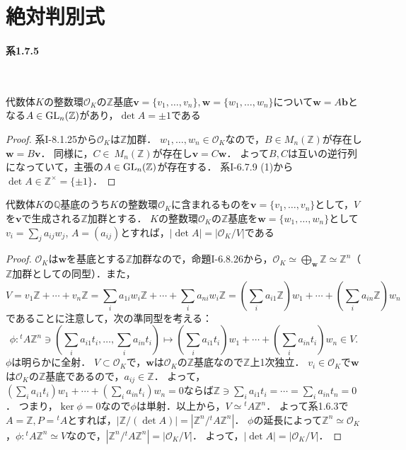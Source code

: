 \setcounter{section}{6}
\section{絶対判別式}
\paragraph{系1.7.5}~
\begin{screen}
  代数体$K$の整数環$\mathcal{O}_K$の$\mathbb{Z}$基底$\boldsymbol{v} = \{v_1, \ldots, v_n\}, \boldsymbol{w} = \{w_1, \ldots, w_n\}$について$\boldsymbol{w} = A\boldsymbol{b}$となる$A\in\operatorname{GL}_n(\mathbb{Z})$があり，$\det{A} = \pm 1$である
\end{screen}
\begin{proof}
  系I-8.1.25から$\mathcal{O}_K$は$\mathbb{Z}$加群．
  $w_1, \ldots, w_n\in\mathcal{O}_K$なので，$B\in M_n(\mathbb{Z})$が存在し$\boldsymbol{w} = B\boldsymbol{v}$．
  同様に，$C\in\ M_n(\mathbb{Z})$が存在し$\boldsymbol{v} = C\boldsymbol{w}$．
  よって$B, C$は互いの逆行列になっていて，主張の$A\in\operatorname{GL}_n(\mathbb{Z})$が存在する．
  系I-6.7.9 (1)から$\det A\in\mathbb{Z}^\times = \{\pm 1\}$．
\end{proof}

\begin{screen}
  代数体$K$の$\mathbb{Q}$基底のうち$K$の整数環$\mathcal{O}_K$に含まれるものを$\boldsymbol{v} = \{v_1, \ldots, v_n\}$として，$V$を$\boldsymbol{v}$で生成される$\mathbb{Z}$加群とする．
  $K$の整数環$\mathcal{O}_K$の$\mathbb{Z}$基底を$\boldsymbol{w} = \{w_1, \ldots, w_n\}$として$v_i = \sum_ja_{ij}w_j$, $A = (a_{ij})$とすれば，$|\det A| = |\mathcal{O}_K/V|$である
\end{screen}
\begin{proof}
  $\mathcal{O}_K$は$\boldsymbol{w}$を基底とする$\mathbb{Z}$加群なので，命題I-6.8.26から，$\mathcal{O}_K\simeq\bigoplus_{\boldsymbol{w}}\mathbb{Z}\simeq\mathbb{Z}^n$（$\mathbb{Z}$加群としての同型）．また，
  \[V = v_1\mathbb{Z} + \cdots + v_n\mathbb{Z} = \sum_ia_{1i}w_i\mathbb{Z} + \cdots + \sum_ia_{ni}w_i\mathbb{Z} = \left(\sum_ia_{i1}\mathbb{Z}\right)w_1 + \cdots + \left(\sum_ia_{in}\mathbb{Z}\right)w_n\]
  であることに注意して，次の準同型を考える：
  \[\phi\colon {}^tA\mathbb{Z}^n \ni \left(\sum_ia_{i1}t_i, \ldots, \sum_ia_{in}t_i\right) \mapsto \left(\sum_ia_{i1}t_i\right)w_1 + \cdots + \left(\sum_ia_{in}t_i\right)w_n \in V.\]
  $\phi$は明らかに全射．
  $V\subset\mathcal{O}_K$で，$\boldsymbol{w}$は$\mathcal{O}_K$の$\mathbb{Z}$基底なので$\mathbb{Z}$上1次独立．
  $v_i\in\mathcal{O}_K$で$\boldsymbol{w}$は$\mathcal{O}_K$の$\mathbb{Z}$基底であるので，$a_{ij}\in\mathbb{Z}$．
  よって，$(\sum_ia_{i1}t_i)w_1 + \cdots + (\sum_ia_{in}t_i)w_n = 0$ならば$\mathbb{Z}\ni\sum_ia_{i1}t_i = \cdots = \sum_ia_{in}t_n = 0$．
  つまり，$\ker\phi = 0$なので$\phi$は単射．以上から，$V\simeq{}^tA\mathbb{Z}^n$．
  よって系1.6.3で$A = \mathbb{Z}, P = {}^tA$とすれば，$|\mathbb{Z}/(\det A)| = |\mathbb{Z}^n/{}^tA\mathbb{Z}^n|$．
  $\phi$の延長によって$\mathbb{Z}^n\simeq\mathcal{O}_K$，$\phi\colon{}^tA\mathbb{Z}^n\simeq V$なので，$|\mathbb{Z}^n/{}^tA\mathbb{Z}^n| = |\mathcal{O}_K/V|$．
  よって，$|\det A| = |\mathcal{O}_K/V|$．
\end{proof}

